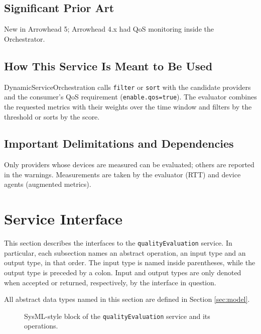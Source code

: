 \documentclass[a4paper]{arrowhead}
\begin{document}
\subsection{Significant Prior Art}

New in Arrowhead 5; Arrowhead 4.x had QoS monitoring inside the Orchestrator.

\subsection{How This Service Is Meant to Be Used}

Dynamic\allowbreak{}Service\allowbreak{}Orchestration calls \texttt{filter} or \texttt{sort} with the candidate providers and the consumer's QoS requirement (\texttt{enable.\allowbreak{}qos=\allowbreak{}true}). The evaluator combines the requested metrics with their weights over the time window and filters by the threshold or sorts by the score.

\subsection{Important Delimitations and Dependencies}
\label{sec:delimitations}

Only providers whose devices are measured can be evaluated; others are reported in the warnings. Measurements are taken by the evaluator (RTT) and device agents (augmented metrics).

\newpage

\section{Service Interface}
\label{sec:operations}

This section describes the interfaces to the \texttt{qualityEvaluation} service.
In particular, each subsection names an abstract operation, an input type and an output type, in that order.
The input type is named inside parentheses, while the output type is preceded by a colon.
Input and output types are only denoted when accepted or returned, respectively, by the interface in question.

All abstract data types named in this section are defined in Section \ref{sec:model}.

\begin{figure}[ht!]
  \centering
  \caption{SysML-style block of the \texttt{qualityEvaluation} service and its operations.}
  \label{fig:SD}
\end{figure}
\end{document}
